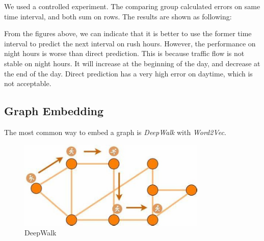 \documentclass[fontset=none]{ctexart}
\theoremstyle{definition}
\theoremstyle{remark}
\begin{document}
We used a controlled experiment. The comparing group calculated errors on same time interval, and both sum on rows.
The results are shown as following:
\begin{figure}[h]
  \centering
  \quad
\end{figure}

From the figures above, we can indicate that it is better to use the former time interval to predict the next interval
on rush hours.
However, the performance on night hours is worse than direct prediction. This is because traffic flow is not stable on night hours.
It will increase at the beginning of the day, and decrease at the end of the day.
Direct prediction has a very high error on daytime, which is not acceptable.

\clearpage
\subsection{Graph Embedding}
The most common way to embed a graph is \textit{DeepWalk} with \textit{Word2Vec}.
\begin{figure}[htb]
  \centering
  \includegraphics[width=0.8\textwidth]{images/8-2-9.jpg}
  \caption{DeepWalk}
  \label{fig: 829}
\end{figure}
\end{document}
